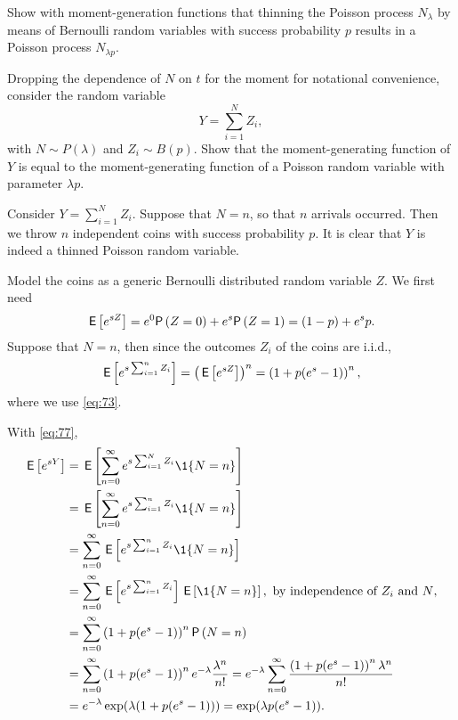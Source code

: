 \begin{exercise}{\faCalculator}\label{ex:18888}
Show with moment-generation functions 
that thinning the Poisson process $N_\lambda$ by means of Bernoulli random variables with success probability $p$ results in a Poisson process $N_{\lambda p}$.
  \begin{hint}
Dropping the dependence of $N$ on $t$ for the moment for notational convenience,  consider the random variable 
  \begin{equation*}
    Y = \sum_{i=1}^N Z_i,
  \end{equation*}
  with $N\sim P(\lambda)$ and $Z_i\sim B(p)$. Show that the moment-generating function of $Y$ is equal to the moment-generating
  function of a Poisson random variable with parameter $\lambda p$.
  \end{hint}
    \begin{solution}
Consider $Y=\sum_{i=1}^N Z_i$. Suppose that $N=n$, so that $n$
arrivals occurred. Then we throw $n$ independent coins with success probability
$p$. It is clear that $Y$ is indeed a thinned Poisson random variable.

Model the coins as a generic Bernoulli distributed random variable
$Z$.  We first need
\begin{equation*}
  \E{e^{s Z}} = e^0 \P{Z=0} + e^{s} \P{Z=1} = (1-p) + e^s p.
\end{equation*}
Suppose that $N=n$, then since the outcomes $Z_i$ of the coins are i.i.d.,
\begin{equation*}
\,\mathsf{E}\left[e^{s\sum_{i=1}^n Z_i}\right] = \left(\,\mathsf{E}\left[e^{s Z}\right]\right)^n = \left(1 + p (e^s - 1)\right)^n,
\end{equation*}
where we use \eqref{eq:73}. 

With  \eqref{eq:77}, 
\begin{align*}
  \E{e^{s Y}}
&= \E{\sum_{n=0}^\infty e^{s\sum_{i=1}^N Z_i} \1{N=n}} \\
&= \E{\sum_{n=0}^\infty e^{s\sum_{i=1}^n Z_i} \1{N=n}} \\
&= \sum_{n=0}^\infty \E{e^{s\sum_{i=1}^n Z_i} \1{N=n}} \\
&= \sum_{n=0}^\infty \E{e^{s\sum_{i=1}^n Z_i}} \E{\1{N=n}}, \text{ by independence of $Z_i$ and $N$}, \\
&= \sum_{n=0}^\infty \left(1+p(e^s-1)\right)^n \P{N=n} \\
&= \sum_{n=0}^\infty \left(1+p(e^s-1)\right)^n e^{-\lambda} \frac{\lambda^n}{n!}
= e^{-\lambda} \sum_{n=0}^\infty \frac{\left(1+p(e^s-1)\right)^n \lambda^n}{n!}\\
&= e^{-\lambda} \exp(\lambda (1+p(e^s-1))) = \exp(\lambda p (e^s - 1)).
\end{align*}
\end{solution}
\end{exercise}    

